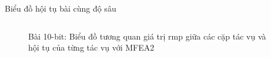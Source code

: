 \begin{frame}{Biểu đồ hội tụ bài cùng độ sâu}
\begin{columns}
\begin{figure}[H]
            \caption{Bài 10-bit: Biểu đồ tương quan giá trị rmp giữa các cặp tác vụ và hội tụ của từng tác vụ với MFEA2}
            \label{fig:my_label}
        \end{figure}
        \end{columns}
    \end{frame}
